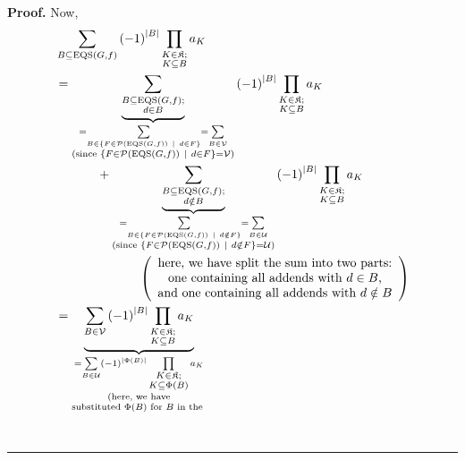 \documentclass[numbers=enddot,12pt,final,onecolumn,notitlepage]{scrartcl}%
\theoremstyle{definition}
\newenvironment{proof}[1][Proof]{\noindent\textbf{#1.} }{\ \rule{0.5em}{0.5em}}
\newenvironment{verlong}{}{}
\let\sumnonlimits\sum
\let\prodnonlimits\prod
\renewcommand{\sum}{\sumnonlimits\limits}
\renewcommand{\prod}{\prodnonlimits\limits}
\begin{document}
\begin{proof}
\begin{verlong}
Now,%
\begin{align*}
&  \sum_{B\subseteq\operatorname*{EQS}\left(  G,f\right)  }\left(  -1\right)
^{\left\vert B\right\vert }\prod_{\substack{K\in\mathfrak{K};\\K\subseteq
B}}a_{K}\\
&  =\underbrace{\sum_{\substack{B\subseteq\operatorname*{EQS}\left(
G,f\right)  ;\\d\in B}}}_{\substack{=\sum_{B\in\left\{  F\in\mathcal{P}\left(
\operatorname*{EQS}\left(  G,f\right)  \right)  \ \mid\ d\in F\right\}  }%
=\sum_{B\in\mathcal{V}}\\\text{(since }\left\{  F\in\mathcal{P}\left(
\operatorname*{EQS}\left(  G,f\right)  \right)  \ \mid\ d\in F\right\}
=\mathcal{V}\text{)}}}\left(  -1\right)  ^{\left\vert B\right\vert }%
\prod_{\substack{K\in\mathfrak{K};\\K\subseteq B}}a_{K}\\
&  \ \ \ \ \ \ \ \ \ \ +\underbrace{\sum_{\substack{B\subseteq
\operatorname*{EQS}\left(  G,f\right)  ;\\d\notin B}}}_{\substack{=\sum
_{B\in\left\{  F\in\mathcal{P}\left(  \operatorname*{EQS}\left(  G,f\right)
\right)  \ \mid\ d\notin F\right\}  }=\sum_{B\in\mathcal{U}}\\\text{(since
}\left\{  F\in\mathcal{P}\left(  \operatorname*{EQS}\left(  G,f\right)
\right)  \ \mid\ d\notin F\right\}  =\mathcal{U}\text{)}}}\left(  -1\right)
^{\left\vert B\right\vert }\prod_{\substack{K\in\mathfrak{K};\\K\subseteq
B}}a_{K}\\
&  \ \ \ \ \ \ \ \ \ \ \ \ \ \ \ \ \ \ \ \ \left(
\begin{array}
[c]{c}%
\text{here, we have split the sum into two parts:}\\
\text{one containing all addends with }d\in B\text{,}\\
\text{and one containing all addends with }d\notin B
\end{array}
\right) \\
&  =\underbrace{\sum_{B\in\mathcal{V}}\left(  -1\right)  ^{\left\vert
B\right\vert }\prod_{\substack{K\in\mathfrak{K};\\K\subseteq B}}a_{K}%
}_{\substack{=\sum_{B\in\mathcal{U}}\left(  -1\right)  ^{\left\vert
\Phi\left(  B\right)  \right\vert }\prod_{\substack{K\in\mathfrak{K}%
;\\K\subseteq\Phi\left(  B\right)  }}a_{K}\\\text{(here, we have}%
\\\text{substituted }\Phi\left(  B\right)  \text{ for }B\text{ in the
}}}
\end{align*}
\end{verlong}
\end{proof}
\end{document}
